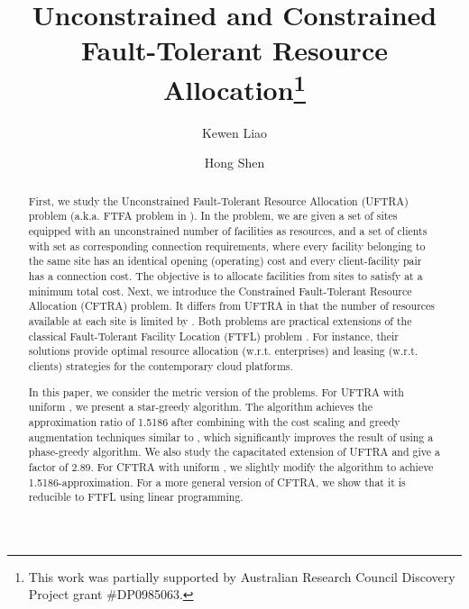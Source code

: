 \documentclass[10pt]{llncs}
\begin{document}
\title{Unconstrained and Constrained Fault-Tolerant Resource Allocation\thanks{This work was partially supported by Australian Research Council Discovery
Project grant \#DP0985063.}}


\author{Kewen Liao \and Hong Shen\\
}


\maketitle
\begin{abstract}
First, we study the Unconstrained Fault-Tolerant Resource Allocation
(UFTRA) problem (a.k.a. FTFA problem in \cite{shihongftfa}). In the
problem, we are given a set of sites equipped with an unconstrained
number of facilities as resources, and a set of clients with set 
as corresponding connection requirements, where every facility belonging
to the same site has an identical opening (operating) cost and every
client-facility pair has a connection cost. The objective is to allocate
facilities from sites to satisfy  at a minimum total
cost. Next, we introduce the Constrained Fault-Tolerant Resource Allocation
(CFTRA) problem. It differs from UFTRA in that the number of resources
available at each site  is limited by . Both problems
are practical extensions of the classical Fault-Tolerant Facility
Location (FTFL) problem \cite{Jain00FTFL}. For instance, their solutions
provide optimal resource allocation (w.r.t. enterprises) and leasing
(w.r.t. clients) strategies for the contemporary cloud platforms. 

In this paper, we consider the metric version of the problems. For
UFTRA with uniform , we present a star-greedy algorithm.
The algorithm achieves the approximation ratio of 1.5186 after combining
with the cost scaling and greedy augmentation techniques similar to
\cite{Charikar051.7281.853,Mahdian021.52}, which significantly improves
the result of \cite{shihongftfa} using a phase-greedy algorithm.
We also study the capacitated extension of UFTRA and give a factor
of 2.89. For CFTRA with uniform , we slightly modify
the algorithm to achieve 1.5186-approximation. For a more general
version of CFTRA, we show that it is reducible to FTFL using linear
programming. 
\end{abstract}
\thispagestyle{plain} 
\end{document}
